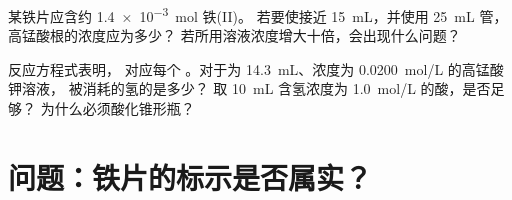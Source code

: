 \begin{exercise}[$\star\star\star$]\label{exo:g11:titration:14}
某铁片应含约 \qty{1.4e-3}{mol} 铁(II)。
若要使接近
\qty{15}{mL}，并使用 \qty{25}{mL} 管，高锰酸根的浓度应为多少？
若所用溶液浓度增大十倍，会出现什么问题？
\end{exercise}

\begin{exercise}[$\star\star\star$]\label{exo:g11:titration:15}
反应方程式表明， 对应每个 。对于为
\qty{14.3}{mL}、浓度为 \qty{0.0200}{mol/L} 的高锰酸钾溶液，
被消耗的氢的是多少？
取 \qty{10}{mL} 含氢浓度为 \qty{1.0}{mol/L} 的酸，是否足够？
为什么必须酸化锥形瓶？
\end{exercise}

\section{问题：铁片的标示是否属实？}

